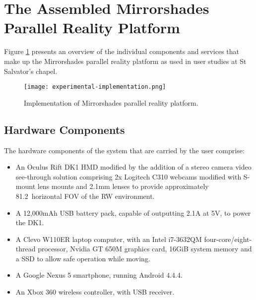 
\section{The Assembled Mirrorshades Parallel Reality Platform}

Figure \ref{experimentalimplementation} presents an overview of the individual components and services that make up the Mirrorshades parallel reality platform as used in user studies at St Salvator's chapel.

\begin{figure}[h]
	\thispagestyle{empty}
	\begin{center}
		\texttt{[image: experimental-implementation.png]}
		\caption{Implementation of Mirrorshades parallel reality platform.}
		\label{experimentalimplementation}
	\end{center}
\end{figure}

\subsection{Hardware Components}
The hardware components of the system that are carried by the user comprise:
\begin{itemize}
	\item An Oculus Rift DK1 HMD modified by the addition of a stereo camera video see-through solution comprising 2x Logitech C310 webcams modified with S-mount lens mounts and 2.1mm lenses to provide approximately 81.2\textdegree\ horizontal FOV of the RW environment.
	\item A 12,000mAh USB battery pack, capable of outputting 2.1A at 5V, to power the DK1.
	\item A Clevo W110ER laptop computer, with an Intel i7-3632QM four-core/eight-thread processor, Nvidia GT 650M graphics card, 16GiB system memory and a SSD to allow safe operation while moving.
	\item A Google Nexus 5 smartphone, running Android 4.4.4.
	\item An Xbox 360 wireless controller, with USB receiver.
\end{itemize}

